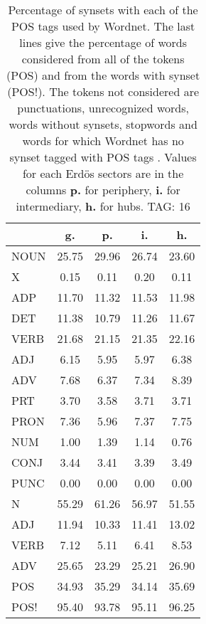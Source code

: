 \begin{table}[h!]
\begin{center}
\begin{tabular}{| l || c | c | c | c |}\hline
 & {\bf g.} & {\bf p.} & {\bf i.} & {\bf h.} \\\hline\hline
NOUN & 25.75  & 29.96  & 26.74  & 23.60 \\
X & 0.15  & 0.11  & 0.20  & 0.11 \\\hline
ADP & 11.70  & 11.32  & 11.53  & 11.98 \\
DET & 11.38  & 10.79  & 11.26  & 11.67 \\\hline
VERB & 21.68  & 21.15  & 21.35  & 22.16 \\\hline
ADJ & 6.15  & 5.95  & 5.97  & 6.38 \\
ADV & 7.68  & 6.37  & 7.34  & 8.39 \\\hline
PRT & 3.70  & 3.58  & 3.71  & 3.71 \\
PRON & 7.36  & 5.96  & 7.37  & 7.75 \\
NUM & 1.00  & 1.39  & 1.14  & 0.76 \\
CONJ & 3.44  & 3.41  & 3.39  & 3.49 \\
PUNC & 0.00  & 0.00  & 0.00  & 0.00 \\\hline\hline\hline
N & 55.29  & 61.26  & 56.97  & 51.55 \\\hline
ADJ & 11.94  & 10.33  & 11.41  & 13.02 \\\hline
VERB & 7.12  & 5.11  & 6.41  & 8.53 \\\hline
ADV & 25.65  & 23.29  & 25.21  & 26.90 \\\hline\hline
POS & 34.93  & 35.29  & 34.14  & 35.69 \\\hline
POS! & 95.40  & 93.78  & 95.11  & 96.25 \\\hline
\end{tabular}
\caption{Percentage of synsets with each of the POS tags used by Wordnet. The last lines give the percentage of words considered from all of the tokens (POS) and from the words with synset (POS!). The tokens not considered are punctuations, unrecognized words, words without synsets, stopwords and words for which Wordnet has no synset  tagged with POS tags . Values for each Erd\"os sectors are in the columns {{\bf p.}} for periphery, {{\bf i.}} for intermediary, {{\bf h.}} for hubs. TAG: 16}
\end{center}
\end{table}